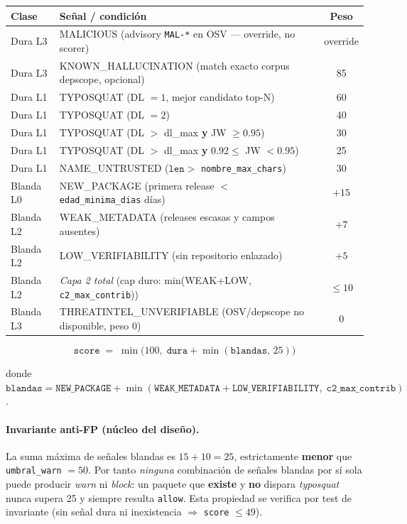 \documentclass[11pt,a4paper]{article}
\begin{document}
\begin{center}
\small
\begin{tabular}{@{}llc@{}}
\toprule
\textbf{Clase} & \textbf{Señal / condición} & \textbf{Peso} \\
\midrule
Dura L3 & MALICIOUS (advisory \texttt{MAL-*} en OSV --- override, no scorer) & override \\
Dura L3 & KNOWN\_HALLUCINATION (match exacto corpus depscope, opcional) & 85 \\
Dura L1 & TYPOSQUAT (DL $=1$, mejor candidato top-N) & 60 \\
Dura L1 & TYPOSQUAT (DL $=2$) & 40 \\
Dura L1 & TYPOSQUAT (DL $>$ dl\_max \textbf{y} JW $\ge 0.95$) & 30 \\
Dura L1 & TYPOSQUAT (DL $>$ dl\_max \textbf{y} $0.92 \le$ JW $< 0.95$) & 25 \\
Dura L1 & NAME\_UNTRUSTED ($\mathtt{len} >$ \texttt{nombre_max_chars}) & 30 \\
Blanda L0 & NEW\_PACKAGE (primera release $<$ \texttt{edad_minima_dias} días) & $+15$ \\
Blanda L2 & WEAK\_METADATA (releases escasas y campos ausentes) & $+7$ \\
Blanda L2 & LOW\_VERIFIABILITY (sin repositorio enlazado) & $+5$ \\
Blanda L2 & \textit{Capa 2 total} (cap duro: min(WEAK+LOW, \texttt{c2_max_contrib})) & $\le 10$ \\
Blanda L3 & THREATINTEL\_UNVERIFIABLE (OSV/depscope no disponible, peso 0) & 0 \\
\bottomrule
\end{tabular}
\end{center}

\[
\mathtt{score} \;=\; \min\bigl(100,\; \mathtt{dura} + \min(\mathtt{blandas},\,25)\bigr)
\]

donde $\mathtt{blandas} = \mathtt{NEW\_PACKAGE} + \min(\mathtt{WEAK\_METADATA} +
\mathtt{LOW\_VERIFIABILITY},\; \mathtt{c2\_max\_contrib})$.

\paragraph{Invariante anti-FP (núcleo del diseño).} La suma máxima de señales blandas es
$15 + 10 = 25$, estrictamente \textbf{menor} que \texttt{umbral_warn} $= 50$. Por tanto
\emph{ninguna} combinación de señales blandas por sí sola puede producir \emph{warn} ni
\emph{block}: un paquete que \textbf{existe} y \textbf{no} dispara \emph{typosquat} nunca
supera 25 y siempre resulta \texttt{allow}. Esta propiedad se verifica por test de
invariante (sin señal dura ni inexistencia $\Rightarrow$ \texttt{score} $\le 49$).
\end{document}
